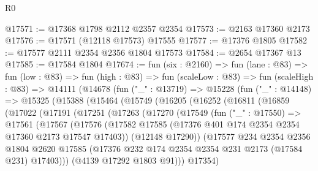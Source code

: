 \begin{lexlean}{R0}
\begin{coremodule}
@17571 := @17368 @1798 @2112 @2357 @2354
@17573 := @2163 @17360 @2173
@17576 := @17571 (@12118 @17573) @17555
@17577 := @17376 @1805
@17582 := @17577 @2111 @2354 @2356 @1804 @17573
@17584 := @2654 @17367 @13
@17585 := @17584 @1804
@17674 := fun (six : @2160) =>
  fun (lane : @83) =>
  fun (low : @83) =>
  fun (high : @83) =>
  fun (scaleLow : @83) =>
  fun (scaleHigh : @83) =>
  @14111
    (@14678
      (fun ("_" : @13719) =>
      @15228
        (fun ("_" : @14148) =>
        @15325
          (@15388
            (@15464
              (@15749
                (@16205
                  (@16252
                    (@16811
                      (@16859
                        (@17022
                          (@17191
                            (@17251
                              (@17263
                                (@17270
                                  (@17549
                                    (fun ("_" : @17550) =>
                                    @17561
                                      (@17567
                                        (@17576
                                          (@17582
                                            @17585
                                            (@17376
                                              @401
                                              @174
                                              @2354
                                              @2354
                                              @17360
                                              @2173
                                              @17547
                                              @17403))
                                          (@12148 @17290))
                                        (@17577
                                          @234
                                          @2354
                                          @2356
                                          @1804
                                          @2620
                                          @17585
                                          (@17376
                                            @232
                                            @174
                                            @2354
                                            @2354
                                            @231
                                            @2173
                                            (@17584 @231)
                                            @17403)))
                                      (@4139 @17292 @1803 @91)))
                                  @17354)

\end{coremodule}
\end{lexlean}
